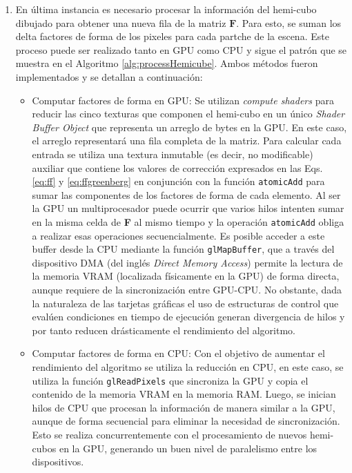 \begin{enumerate}
	\item En última instancia es necesario procesar la información del hemi-cubo dibujado para obtener una nueva fila de la matriz $\mathbf{F}$. Para esto, se suman los delta factores de forma de los pixeles para cada partche de la escena. Este proceso puede ser realizado tanto en GPU como CPU y sigue el patrón que se muestra en el Algoritmo \ref{alg:processHemicube}. Ambos métodos fueron implementados y se detallan a continuación:
	\begin{itemize}
		\item Computar factores de forma en GPU: Se utilizan \textit{compute shaders} para reducir las cinco texturas que componen el hemi-cubo en un único \textit{Shader Buffer Object} que representa un arreglo de bytes en la GPU. En este caso, el arreglo representará una fila completa de la matriz. Para calcular cada entrada se utiliza una textura inmutable (es decir, no modificable) auxiliar que contiene los valores de corrección expresados en las Eqs. \eqref{eq:ff} y \eqref{eq:ffgreenberg} en conjunción con la función \verb|atomicAdd| para sumar las componentes de los factores de forma de cada elemento. Al ser la GPU un multiprocesador puede ocurrir que varios hilos intenten sumar en la misma celda de \textbf{F} al mismo tiempo y la operación \verb|atomicAdd| obliga a realizar esas operaciones secuencialmente.
		Es posible acceder a este buffer desde la CPU mediante la función \verb|glMapBuffer|, que a través del dispositivo DMA (del inglés \textit{Direct Memory Access}) permite la lectura de la memoria VRAM (localizada físicamente en la GPU) de forma directa, aunque requiere de la sincronización entre GPU-CPU.
		No obstante, dada la naturaleza de las tarjetas gráficas el uso de estructuras de control que evalúen condiciones en tiempo de ejecución generan divergencia de hilos y por tanto reducen drásticamente el rendimiento del algoritmo.
		\item Computar factores de forma en CPU: Con el objetivo de aumentar el rendimiento del algoritmo se utiliza la reducción en CPU, en este caso, se utiliza la función \verb|glReadPixels| que sincroniza la GPU y copia el contenido de la memoria VRAM en la memoria RAM. Luego, se inician hilos de CPU que procesan la información de manera similar a la GPU, aunque de forma secuencial para eliminar la necesidad de sincronización.  Esto se realiza concurrentemente con el procesamiento de nuevos hemi-cubos en la GPU, generando un buen nivel de paralelismo entre los dispositivos.
	\end{itemize}
 \end{enumerate}

